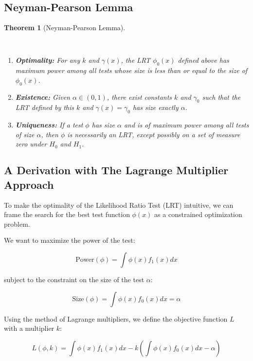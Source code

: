 \documentclass[
  letterpaper,
  DIV=11,
  numbers=noendperiod]{scrreprt}
\renewcommand{\[}{\begin{equation}}
\renewcommand{\]}{\end{equation}}
\theoremstyle{definition}
\theoremstyle{plain}
\theoremstyle{plain}
\theoremstyle{plain}
\newtheorem{theorem}{Theorem}[chapter]
\theoremstyle{definition}
\theoremstyle{plain}
\theoremstyle{remark}
\begin{document}
\subsection{Neyman-Pearson Lemma}\label{neyman-pearson-lemma}

\begin{theorem}[Neyman-Pearson
Lemma]\protect\hypertarget{thm-neyman-pearson}{}\label{thm-neyman-pearson}

~

\begin{enumerate}
\def\labelenumi{\alph{enumi})}
\item
  \textbf{Optimality:} For any \(k\) and \(\gamma(x)\), the LRT
  \(\phi_0(x)\) defined above has maximum power among all tests whose
  size is less than or equal to the size of \(\phi_0(x)\).
\item
  \textbf{Existence:} Given \(\alpha \in (0, 1)\), there exist constants
  \(k\) and \(\gamma_0\) such that the LRT defined by this \(k\) and
  \(\gamma(x) = \gamma_0\) has size exactly \(\alpha\).
\item
  \textbf{Uniqueness:} If a test \(\phi\) has size \(\alpha\) and is of
  maximum power among all tests of size \(\alpha\), then \(\phi\) is
  necessarily an LRT, except possibly on a set of measure zero under
  \(H_0\) and \(H_1\).
\end{enumerate}

\end{theorem}

\subsection{A Derivation with The Lagrange Multiplier
Approach}\label{a-derivation-with-the-lagrange-multiplier-approach}

To make the optimality of the Likelihood Ratio Test (LRT) intuitive, we
can frame the search for the best test function \(\phi(x)\) as a
constrained optimization problem.

We want to maximize the power of the test:

\[
\text{Power}(\phi) = \int \phi(x) f_1(x) dx
\]

subject to the constraint on the size of the test \(\alpha\):

\[
\text{Size}(\phi) = \int \phi(x) f_0(x) dx = \alpha
\]

Using the method of Lagrange multipliers, we define the objective
function \(L\) with a multiplier \(k\):

\[
L(\phi, k) = \int \phi(x) f_1(x) dx - k \left( \int \phi(x) f_0(x) dx - \alpha \right)
\]
\end{document}
